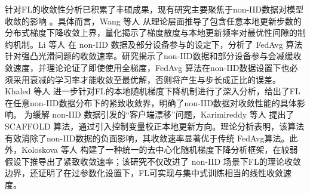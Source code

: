 针对FL的收敛性分析已积累了丰硕成果，现有研究主要聚焦于non-IID数据对模型收敛的影响 \cite{wang2019adaptive,li2020convergence,khaled2020tighter,karimireddy2020scaffold,koloskova2020unified,yang2021achieving,amiri2022impact,wang2022unified,woodworth2020minibatch}。具体而言，Wang 等人 \cite{wang2019adaptive} 从理论层面推导了包含任意本地更新步数的分布式梯度下降收敛上界，量化揭示了梯度散度与本地更新频率对最优性间隙的制约机制。Li 等人 \cite{li2020convergence} 在 non-IID 数据及部分设备参与的设定下，分析了 FedAvg 算法针对强凸光滑问题的收敛速率。研究揭示了non-IID数据和部分设备参与会减缓收敛速度，并理论论证了即使使用全梯度，FedAvg 算法在non-IID数据设置下也必须采用衰减的学习率才能收敛至最优解，否则将产生与步长成正比的误差。Khaled 等人 \cite{khaled2020tighter} 进一步针对FL的本地随机梯度下降机制进行了深入分析，给出了FL在任意non-IID数据分布下的紧致收敛界，明确了non-IID数据对收敛性能的具体影响。
为缓解 non-IID 数据引发的“客户端漂移”问题，Karimireddy 等人 \cite{karimireddy2020scaffold} 提出了 SCAFFOLD 算法，通过引入控制变量校正本地更新方向。理论分析表明，该算法有效消除了non-IID数据的负面影响，其收敛速率显著优于传统 FedAvg算法。此外，Koloskova 等人 \cite{koloskova2020unified} 构建了一种统一的去中心化随机梯度下降分析框架，在较弱假设下推导出了紧致收敛速率；该研究不仅改进了 non-IID 场景下FL的理论收敛边界，还证明了在过参数化设置下，FL可实现与集中式训练相当的线性收敛速度。
